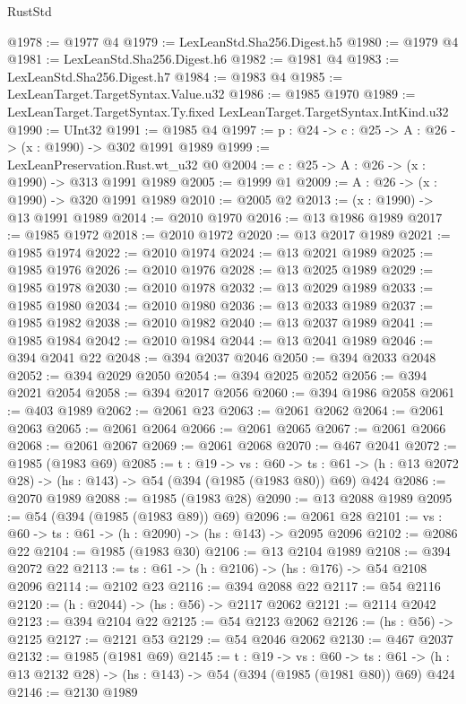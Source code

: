 \begin{lexlean}{RustStd}
\begin{coremodule}
{\begin{coremodule}
{{{{{{{{@1978 := @1977 @4
@1979 := LexLeanStd.Sha256.Digest.h5
@1980 := @1979 @4
@1981 := LexLeanStd.Sha256.Digest.h6
@1982 := @1981 @4
@1983 := LexLeanStd.Sha256.Digest.h7
@1984 := @1983 @4
@1985 := LexLeanTarget.TargetSyntax.Value.u32
@1986 := @1985 @1970
@1989 := LexLeanTarget.TargetSyntax.Ty.fixed LexLeanTarget.TargetSyntax.IntKind.u32
@1990 := UInt32
@1991 := @1985 @4
@1997 := {p : @24} -> {c : @25} -> {A : @26} -> (x : @1990) -> @302 @1991 @1989
@1999 := LexLeanPreservation.Rust.wt_u32 @0
@2004 := {c : @25} -> {A : @26} -> (x : @1990) -> @313 @1991 @1989
@2005 := @1999 @1
@2009 := {A : @26} -> (x : @1990) -> @320 @1991 @1989
@2010 := @2005 @2
@2013 := (x : @1990) -> @13 @1991 @1989
@2014 := @2010 @1970
@2016 := @13 @1986 @1989
@2017 := @1985 @1972
@2018 := @2010 @1972
@2020 := @13 @2017 @1989
@2021 := @1985 @1974
@2022 := @2010 @1974
@2024 := @13 @2021 @1989
@2025 := @1985 @1976
@2026 := @2010 @1976
@2028 := @13 @2025 @1989
@2029 := @1985 @1978
@2030 := @2010 @1978
@2032 := @13 @2029 @1989
@2033 := @1985 @1980
@2034 := @2010 @1980
@2036 := @13 @2033 @1989
@2037 := @1985 @1982
@2038 := @2010 @1982
@2040 := @13 @2037 @1989
@2041 := @1985 @1984
@2042 := @2010 @1984
@2044 := @13 @2041 @1989
@2046 := @394 @2041 @22
@2048 := @394 @2037 @2046
@2050 := @394 @2033 @2048
@2052 := @394 @2029 @2050
@2054 := @394 @2025 @2052
@2056 := @394 @2021 @2054
@2058 := @394 @2017 @2056
@2060 := @394 @1986 @2058
@2061 := @403 @1989
@2062 := @2061 @23
@2063 := @2061 @2062
@2064 := @2061 @2063
@2065 := @2061 @2064
@2066 := @2061 @2065
@2067 := @2061 @2066
@2068 := @2061 @2067
@2069 := @2061 @2068
@2070 := @467 @2041
@2072 := @1985 (@1983 @69)
@2085 := {t : @19} ->
  {vs : @60} ->
  {ts : @61} -> (h : @13 @2072 @28) -> (hs : @143) -> @54 (@394 (@1985 (@1983 @80)) @69) @424
@2086 := @2070 @1989
@2088 := @1985 (@1983 @28)
@2090 := @13 @2088 @1989
@2095 := @54 (@394 (@1985 (@1983 @89)) @69)
@2096 := @2061 @28
@2101 := {vs : @60} -> {ts : @61} -> (h : @2090) -> (hs : @143) -> @2095 @2096
@2102 := @2086 @22
@2104 := @1985 (@1983 @30)
@2106 := @13 @2104 @1989
@2108 := @394 @2072 @22
@2113 := {ts : @61} -> (h : @2106) -> (hs : @176) -> @54 @2108 @2096
@2114 := @2102 @23
@2116 := @394 @2088 @22
@2117 := @54 @2116
@2120 := (h : @2044) -> (hs : @56) -> @2117 @2062
@2121 := @2114 @2042
@2123 := @394 @2104 @22
@2125 := @54 @2123 @2062
@2126 := (hs : @56) -> @2125
@2127 := @2121 @53
@2129 := @54 @2046 @2062
@2130 := @467 @2037
@2132 := @1985 (@1981 @69)
@2145 := {t : @19} ->
  {vs : @60} ->
  {ts : @61} -> (h : @13 @2132 @28) -> (hs : @143) -> @54 (@394 (@1985 (@1981 @80)) @69) @424
@2146 := @2130 @1989
}}}}}}}}
\end{coremodule}}
\end{coremodule}
\end{lexlean}
